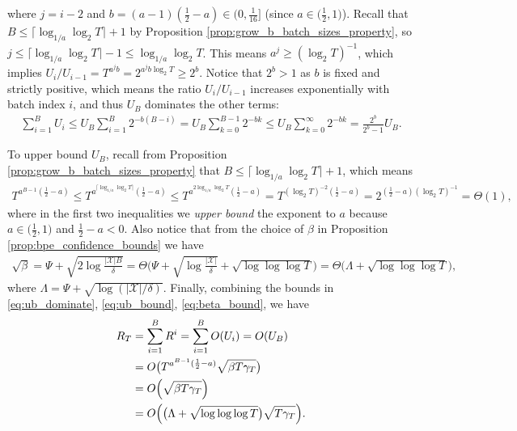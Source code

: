 \documentclass[10pt]{article}
\begin{document}
where $j=i-2$ and $b = (a-1)(\frac{1}{2}-a)\in (0,\frac{1}{16}]$ (since $a \in \big(\frac{1}{2},1\big)$). Recall that $B \leq \lceil\log_{1/a}\log_2T \rceil+1 $ by Proposition \ref{prop:grow_b_batch_sizes_property}, so $j \leq \lceil\log_{1/a}\log_2T \rceil -1 \leq \log_{1/a}\log_2T$. This means $a^j \geq (\log_2 T)^{-1} $, which implies $ U_i/U_{i-1} =  T^{a^{j}b} = 2^{a^{j}b \log_2 T} \geq 2^{b}$. Notice that $2^b > 1$ as $b$ is fixed and strictly positive, which means the ratio $U_i/U_{i-1} $ increases exponentially with batch index $i$, and thus $U_B$ dominates the other terms:
\begin{align}
    \sum_{i=1}^B U_i 
    \leq U_B \sum_{i=1}^B 2^{-b(B-i)}
    = U_B \sum_{k=0}^{B-1} 2^{-bk}
    \leq U_B \sum_{k=0}^{\infty} 2^{-bk}
    = \frac{2^b}{2^b-1}U_B . \label{eq:ub_dominate}
\end{align}

To upper bound $U_B$, recall from Proposition \ref{prop:grow_b_batch_sizes_property} that $B \leq \lceil \log_{1/a}\log_2 T \rceil + 1$, which means
\begin{align}
    T^{a^{B-1}(\frac{1}{2}-a)}
    \leq T^{a^{\lceil \log_{1/a}\log_2 T \rceil}(\frac{1}{2}-a)}
    \leq T^{a^{2 \log_{1/a}\log_2 T}(\frac{1}{2}-a)}
    = T^{(\log_2 T)^{-2}(\frac{1}{2}-a)}
    = 2^{(\frac{1}{2}-a) (\log_2 T)^{-1}}
    = \Theta(1), \label{eq:ub_bound}
\end{align}
where in the first two inequalities we \emph{upper bound} the exponent to $a$ because $a \in \big(\frac{1}{2},1\big)$ and $\frac{1}{2}-a < 0$.
Also notice that from the choice of $\beta$ in Proposition \ref{prop:bpe_confidence_bounds} we have
\begin{align}
    \sqrt{\beta} 
    = \Psi + \sqrt{2\log\frac{\lvert\mathcal{X}\rvert B}{\delta}} 
    = \Theta\biggl(\Psi + \sqrt{\log\frac{\lvert\mathcal{X}\rvert}{\delta}}+\sqrt{\log\log\log T}\biggr)
    = \Theta \bigl(\Lambda + \sqrt{\log \log\log T}\bigr), \label{eq:beta_bound}
\end{align}
where $\Lambda=\Psi+\sqrt{\log(|\mathcal{X}|/\delta)}$.
Finally, combining the bounds in \eqref{eq:ub_dominate}, \eqref{eq:ub_bound}, \eqref{eq:beta_bound}, we have
\begin{align}
    R_T 
    & = \sum_{i=1}^B R^i
    = \sum_{i=1}^B O(U_i)
    = O(U_B) \\
    & = O\bigl( T^{a^{B-1}(\frac{1}{2}-a)}  \sqrt{\beta T\gamma_T} \bigr) \\
    & = O\Bigl( \sqrt{\beta T\gamma_T} \Bigr) \\
    & = O\Bigl(\bigl(\Lambda + \sqrt{\log \log\log T}\bigr) \sqrt{T\gamma_T}\Bigr).
\end{align}
\end{document}
